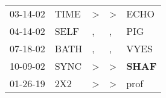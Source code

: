 \begin{supertabular}{p{0.07\textwidth}p{0.06\textwidth}p{0.02\textwidth}p{0.02\textwidth}p{0.06\textwidth}}
          03-14-02\textsuperscript{} &  TIME\textsuperscript{} &  \textgreater &     \textgreater &           ECHO\textsuperscript{} \\
          04-14-02\textsuperscript{} &  SELF\textsuperscript{} &             , &                , &            PIG\textsuperscript{} \\
          07-18-02\textsuperscript{} &  BATH\textsuperscript{} &             , &                , &           VYES\textsuperscript{} \\
          10-09-02\textsuperscript{} &  SYNC\textsuperscript{} &  \textgreater &     \textgreater &  \textbf{SHAF\textsuperscript{}} \\
          01-26-19\textsuperscript{} &   2X2\textsuperscript{} &  \textgreater &     \textgreater &           prof\textsuperscript{} \\
\end{supertabular}
